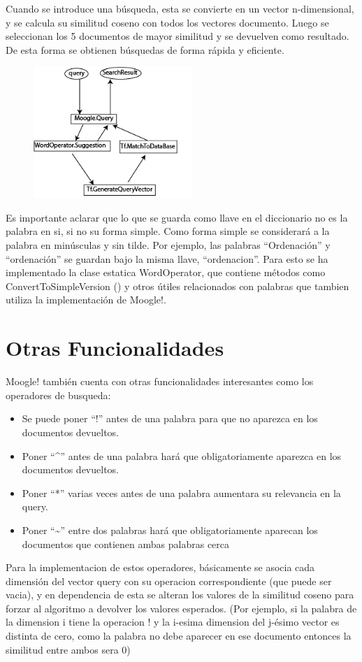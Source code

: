 \documentclass[a4paper, 12pt]{article}
\begin{document}
Cuando se introduce una búsqueda, esta se convierte en un vector n-dimensional, y se calcula su similitud coseno con todos los vectores documento. Luego se seleccionan los 5 documentos de mayor similitud y se devuelven como resultado. De esta forma se obtienen búsquedas de forma rápida y eficiente.

\begin{figure}
    \center
    \includegraphics[width=6cm]{DiagramaDeClases.png}
\end{figure}

Es importante aclarar que lo que se guarda como llave en el diccionario no es la palabra en si, si no su forma simple. Como forma simple se considerará a la palabra en minúsculas y sin tilde. Por ejemplo, las palabras “Ordenación” y “ordenación” se guardan bajo la misma llave, “ordenacion”. Para esto se ha implementado la clase estatica WordOperator, que contiene métodos como ConvertToSimpleVersion () y otros útiles relacionados con palabras que tambien utiliza la implementación de Moogle!.

\section{Otras Funcionalidades}
Moogle! también cuenta con otras funcionalidades interesantes como los operadores de busqueda:
\begin{itemize}
    \item Se puede poner ``!'' antes de una palabra para que no aparezca en los documentos devueltos.
    \item Poner ``\^{}''  antes de una palabra hará que obligatoriamente aparezca en los documentos devueltos.
    \item Poner ``*'' varias veces antes de una palabra aumentara su relevancia en la query.
    \item Poner ``\~{}'' entre dos palabras hará que obligatoriamente aparecan los documentos que contienen ambas palabras cerca
\end{itemize}
Para la implementacion de estos operadores, básicamente se asocia cada dimensión del vector query con su operacion correspondiente (que puede ser vacia), y en dependencia de esta se alteran los valores de la similitud coseno para forzar al algoritmo a devolver los valores esperados. (Por ejemplo, si la palabra de la dimension i tiene la operacion ! y la i-esima dimension del j-ésimo vector es distinta de cero, como la palabra no debe aparecer en ese documento entonces la similitud entre ambos sera 0)
\end{document}
